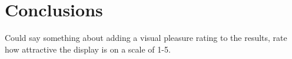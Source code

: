 \section{Conclusions}

Could say something about adding a visual pleasure rating to the results, rate how attractive the display is on a scale of 1-5.